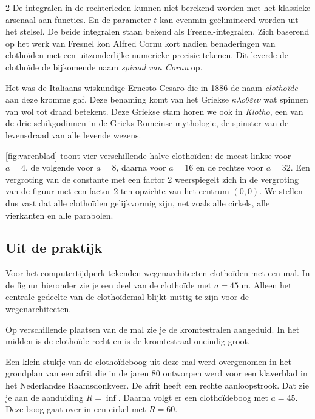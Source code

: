 \begin{multicols}{2}
De integralen in de rechterleden kunnen niet berekend worden met het klassieke arsenaal aan functies. En de parameter $t$ kan evenmin geëlimineerd worden uit het stelsel. De beide integralen staan bekend als Fresnel-integralen. Zich baserend op het werk van Fresnel kon Alfred Cornu kort nadien benaderingen van clothoïden met een uitzonderlijke numerieke precisie tekenen. Dit leverde de clothoïde de bijkomende naam \emph{spiraal van Cornu} op. 

Het was de Italiaans wiskundige Ernesto Cesaro die in 1886 de naam \emph{clothoïde} aan deze kromme gaf. Deze benaming komt van het Griekse $\kappa \lambda o \theta \varepsilon \iota \nu$ wat spinnen van wol tot draad betekent. Deze Griekse stam horen we ook in \emph{Klotho}, een van de drie schikgodinnen in de Grieks-Romeinse mythologie, de spinster van de levensdraad van alle levende wezens.

\autoref{fig:varenblad} toont vier verschillende halve clothoïden: de meest linkse voor $a=4$, de volgende voor $a=8$, daarna voor $a=16$ en de rechtse voor $a=32$. Een vergroting van de constante met een factor 2 weerspiegelt zich in de vergroting van de figuur met een factor 2 ten opzichte van het centrum $(0,0)$. We stellen dus vast dat alle clothoïden gelijkvormig zijn, net zoals alle cirkels, alle vierkanten en alle parabolen.


\subsection{Uit de praktijk}

Voor het computertijdperk tekenden wegenarchitecten clothoïden met een mal. In de figuur hieronder zie je een deel van de clothoïde met $a=45$ m. Alleen het centrale gedeelte van de clothoïdemal blijkt nuttig te zijn voor de wegenarchitecten.

Op verschillende plaatsen van de mal zie je de kromtestralen aangeduid. In het midden is de clothoïde recht en is de kromtestraal oneindig groot.


Een klein stukje van de clothoïdeboog uit deze mal werd overgenomen in het grondplan van een afrit die in de jaren 80 ontworpen werd voor een klaverblad in het Nederlandse Raamsdonkveer. De afrit heeft een rechte aanloopstrook. Dat zie je aan de aanduiding $R=\inf$. Daarna volgt er een clothoïdeboog met $a=45$. Deze boog gaat over in een cirkel met $R=60$. 


\end{multicols}
